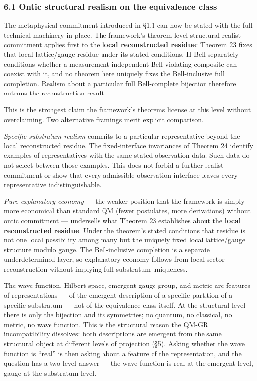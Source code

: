 \documentclass[
]{article}
\begin{document}
\hypertarget{ontic-structural-realism-on-the-equivalence-class}{%
\subsubsection{6.1 Ontic structural realism on the equivalence
class}\label{ontic-structural-realism-on-the-equivalence-class}}

The metaphysical commitment introduced in §1.1 can now be stated with
the full technical machinery in place. The framework's theorem-level
structural-realist commitment applies first to the \textbf{local
reconstructed residue}: Theorem 23 fixes that local lattice/gauge
residue under its stated conditions. H-Bell separately conditions
whether a measurement-independent Bell-violating composite can coexist
with it, and no theorem here uniquely fixes the Bell-inclusive full
completion. Realism about a particular full Bell-complete bijection
therefore outruns the reconstruction result.

This is the strongest claim the framework's theorems license at this
level without overclaiming. Two alternative framings merit explicit
comparison.

\emph{Specific-substratum realism} commits to a particular
representative beyond the local reconstructed residue. The
fixed-interface invariances of Theorem 24 identify examples of
representatives with the same stated observation data. Such data do not
select between those examples. This does not forbid a further realist
commitment or show that every admissible observation interface leaves
every representative indistinguishable.

\emph{Pure explanatory economy} --- the weaker position that the
framework is simply more economical than standard QM (fewer postulates,
more derivations) without ontic commitment --- undersells what Theorem
23 establishes about the \textbf{local reconstructed residue}. Under the
theorem's stated conditions that residue is not one local possibility
among many but the uniquely fixed local lattice/gauge structure modulo
gauge. The Bell-inclusive completion is a separate underdetermined
layer, so explanatory economy follows from local-sector reconstruction
without implying full-substratum uniqueness.

The wave function, Hilbert space, emergent gauge group, and metric are
features of representations --- of the emergent description of a
specific partition of a specific substratum --- not of the equivalence
class itself. At the structural level there is only the bijection and
its symmetries; no quantum, no classical, no metric, no wave function.
This is the structural reason the QM-GR incompatibility dissolves: both
descriptions are emergent from the same structural object at different
levels of projection (§5). Asking whether the wave function is ``real''
is then asking about a feature of the representation, and the question
has a two-level answer --- the wave function is real at the emergent
level, gauge at the substratum level.
\end{document}
